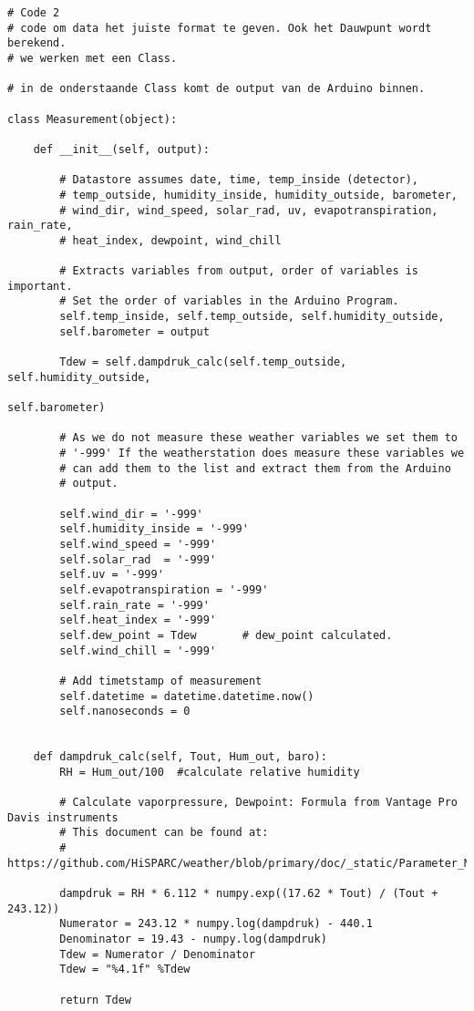 \begin{verbatim}
# Code 2
# code om data het juiste format te geven. Ook het Dauwpunt wordt berekend.
# we werken met een Class.

# in de onderstaande Class komt de output van de Arduino binnen.

class Measurement(object):

    def __init__(self, output):

        # Datastore assumes date, time, temp_inside (detector),
        # temp_outside, humidity_inside, humidity_outside, barometer,
        # wind_dir, wind_speed, solar_rad, uv, evapotranspiration, rain_rate,
        # heat_index, dewpoint, wind_chill

        # Extracts variables from output, order of variables is important.
        # Set the order of variables in the Arduino Program.
        self.temp_inside, self.temp_outside, self.humidity_outside,
        self.barometer = output

        Tdew = self.dampdruk_calc(self.temp_outside, self.humidity_outside,
                                                            self.barometer)

        # As we do not measure these weather variables we set them to
        # '-999' If the weatherstation does measure these variables we
        # can add them to the list and extract them from the Arduino
        # output.

        self.wind_dir = '-999'
        self.humidity_inside = '-999'
        self.wind_speed = '-999'
        self.solar_rad  = '-999'
        self.uv = '-999'
        self.evapotranspiration = '-999'
        self.rain_rate = '-999'
        self.heat_index = '-999'
        self.dew_point = Tdew       # dew_point calculated.
        self.wind_chill = '-999'

        # Add timetstamp of measurement
        self.datetime = datetime.datetime.now()
        self.nanoseconds = 0


    def dampdruk_calc(self, Tout, Hum_out, baro):
        RH = Hum_out/100  #calculate relative humidity

        # Calculate vaporpressure, Dewpoint: Formula from Vantage Pro Davis instruments
        # This document can be found at:
        # https://github.com/HiSPARC/weather/blob/primary/doc/_static/Parameter_Manual.pdf

        dampdruk = RH * 6.112 * numpy.exp((17.62 * Tout) / (Tout + 243.12))
        Numerator = 243.12 * numpy.log(dampdruk) - 440.1
        Denominator = 19.43 - numpy.log(dampdruk)
        Tdew = Numerator / Denominator
        Tdew = "%4.1f" %Tdew

        return Tdew
\end{verbatim}

